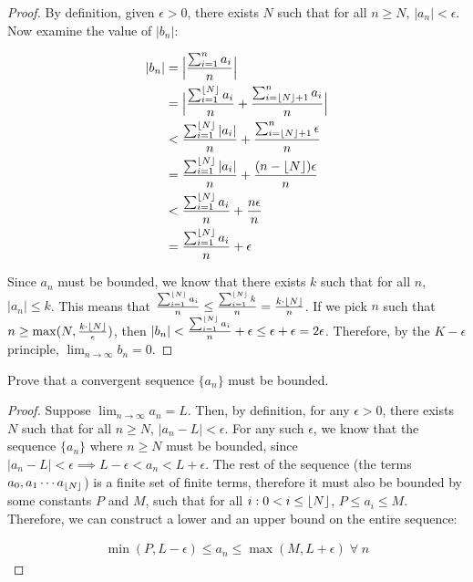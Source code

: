 \begin{proof}
  By definition, given $\epsilon > 0$, there exists $N$ such that for all $n \geq N$, $|a_n| < \epsilon$. Now examine the value of $|b_n|$:

  \begin{align*}
    |b_n| &= \Big|\frac{\sum_{i = 1}^n a_i}{n}\Big| \\
    &= \Big|\frac{\sum_{i = 1}^{\lfloor N\rfloor} a_i}{n} + \frac{\sum_{i = \lfloor N\rfloor + 1}^n a_i}{n}\Big| \\
    &< \frac{\sum_{i = 1}^{\lfloor N\rfloor} |a_i|}{n} + \frac{\sum_{i = \lfloor N\rfloor + 1}^n \epsilon}{n} \\
    &= \frac{\sum_{i = 1}^{\lfloor N\rfloor} |a_i|}{n} + \frac{(n - \lfloor N\rfloor)\epsilon}{n} \\
    &< \frac{\sum_{i = 1}^{\lfloor N\rfloor} a_i}{n} + \frac{n\epsilon}{n} \\
    &= \frac{\sum_{i = 1}^{\lfloor N\rfloor} a_i}{n} + \epsilon \\
  \end{align*}

  Since $a_n$ must be bounded, we know that there exists $k$ such that for all $n$, $|a_n| \leq k$. This means that $\frac{\sum_{i = 1}^{\lfloor N\rfloor} a_i}{n} \leq \frac{\sum_{i = 1}^{\lfloor N\rfloor} k}{n} = \frac{k \cdot \lfloor N\rfloor}{n}$. If we pick $n$ such that $n \geq \max(N, \frac{k \cdot \lfloor N\rfloor}{\epsilon})$, then $|b_n| < \frac{\sum_{i = 1}^{\lfloor N\rfloor} a_i}{n} + \epsilon \leq \epsilon + \epsilon = 2\epsilon$. Therefore, by the $K-\epsilon$ principle, $\lim_{n \rightarrow \infty} b_n = 0$.
\end{proof}

Prove that a convergent sequence $\{a_n\}$ must be bounded.

\begin{proof}
  Suppose $\lim_{n \rightarrow \infty} a_n = L$. Then, by definition, for any $\epsilon > 0$, there exists $N$ such that for all $n \geq N$, $|a_n - L| < \epsilon$. For any such $\epsilon$, we know that the sequence $\{a_n\}$ where $n \geq N$ must be bounded, since $|a_n - L| < \epsilon \implies L - \epsilon < a_n < L + \epsilon$. The rest of the sequence (the terms $a_0, a_1 \cdots a_{\lfloor N\rfloor}$) is a finite set of finite terms, therefore it must also be bounded by some constants $P$ and $M$, such that for all $i: 0 < i \leq \lfloor N\rfloor$, $P \leq a_i \leq M$. Therefore, we can construct a lower and an upper bound on the entire sequence:

  \begin{align*}
    \min(P, L - \epsilon) \leq a_n \leq \max(M, L + \epsilon) \;\forall\; n
  \end{align*}
\end{proof}


